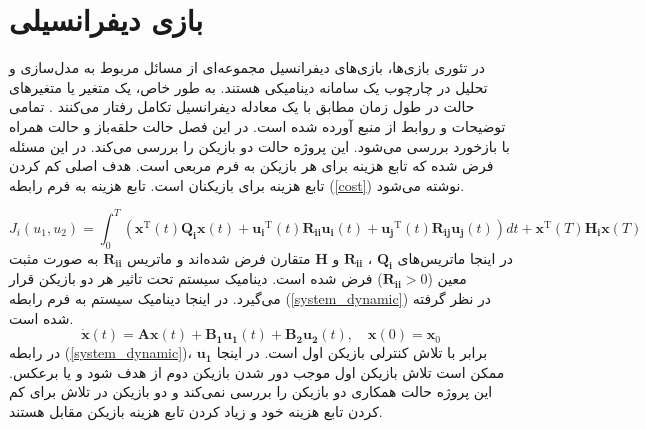 \chapter{بازی دیفرانسیلی}
در تئوری بازی‌ها، بازی‌های دیفرانسیل مجموعه‌ای از مسائل مربوط به مدل‌سازی و تحلیل در چارچوب یک سامانه دینامیکی هستند. به طور خاص، یک متغیر یا متغیرهای حالت در طول زمان مطابق با یک معادله دیفرانسیل تکامل رفتار می‌کنند
\cite{diff_game}.
 تمامی توضیحات و روابط  از منبع 
 \cite{article1}
آورده شده است. در این فصل حالت حلقه‌باز
 و حالت همراه با بازخورد بررسی می‌شود.
 این پروژه حالت دو بازیکن را بررسی می‌کند. در این مسئله فرض شده  که تابع هزینه برای هر بازیکن به فرم مربعی است. 	هدف اصلی کم کردن تابع هزینه برای بازیکنان است. تابع هزینه به فرم رابطه (\ref{cost}) نوشته می‌شود.

 \begin{equation}\label{cost}
 	J_i(u_1, u_2) = \int_{0}^{T}\left( \boldsymbol{x} ^\mathrm{T}(t) \boldsymbol{Q_i} \boldsymbol{x}(t)+
 	 \boldsymbol{u_i} ^\mathrm{T}(t) \boldsymbol{R_{ii}} \boldsymbol{u_i}(t)+
 	 \boldsymbol{u_j} ^\mathrm{T}(t)\boldsymbol{ R_{ij} u_j}(t)
 	\right)dt+
 	\boldsymbol{ x} ^\mathrm{T}(T)\boldsymbol{ H_i}\boldsymbol{ x}(T) 
  \end{equation}
در اینجا ماتریس‌های 
$\boldsymbol{Q_i}$ ، $\boldsymbol{R_{ii}}$
و
$\boldsymbol{H}$
متقارن فرض شده‌اند و ماتریس 
$\boldsymbol{R_{ii}}$
به صورت مثبت معین ($\boldsymbol{R_{ii}}>0$)
فرض شده است.
دینامیک سیستم تحت تاثیر هر دو بازیکن قرار می‌گیرد. در اینجا دینامیک سیستم به فرم رابطه (\ref{system_dynamic}) در نظر گرفته شده ‌است.
\begin{equation}\label{system_dynamic}
	\boldsymbol{\dot x}(t) = \boldsymbol{Ax}(t) + \boldsymbol{B_1u_1}(t) + \boldsymbol{B_2u_2}(t), \quad \boldsymbol{x}(0) = \boldsymbol{x}_0
\end{equation}
در رابطه 
(\ref{system_dynamic})،
$\boldsymbol{u_1}$
برابر با تلاش کنترلی  بازیکن اول است. در اینجا ممکن است تلاش  بازیکن اول موجب دور شدن بازیکن دوم از هدف شود و یا برعکس.  این پروژه حالت همکاری دو بازیکن را بررسی نمی‌کند و دو بازیکن در تلاش برای کم کردن تابع هزینه خود و زیاد کردن تابع هزینه بازیکن مقابل هستند.

